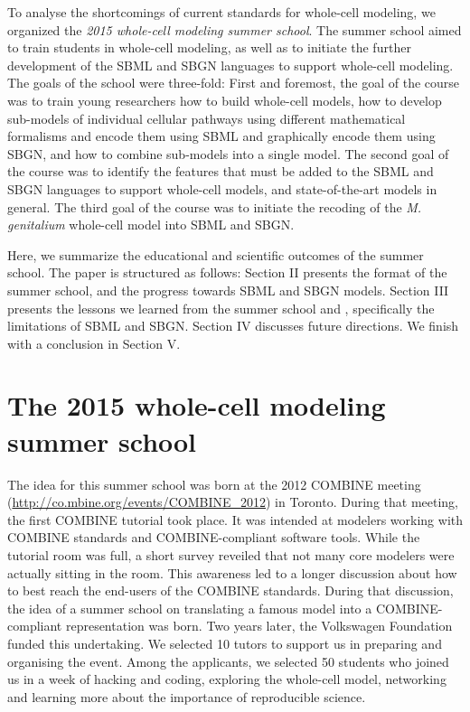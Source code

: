 \documentclass[journal,transmag]{IEEEtran}
\begin{document}
To analyse the shortcomings of current standards for whole-cell modeling, we organized the \emph{2015 whole-cell modeling summer school}. 
The summer school aimed to train students in whole-cell modeling, as well as to initiate the further development of the SBML and SBGN languages to support whole-cell modeling.  
The goals of the school were three-fold: 
First and foremost, the goal of the course was to train young researchers how to build whole-cell models, how to develop sub-models of individual cellular pathways using different mathematical formalisms and encode them using SBML and graphically encode them using SBGN, and how to combine sub-models into a single model. 
The second goal of the course was to identify the features that must be added to the SBML and SBGN languages to support whole-cell models, and state-of-the-art models in general. 
The third goal of the course was to initiate the recoding of the \textit{M. genitalium} whole-cell model into SBML and SBGN.

Here, we summarize the educational and scientific outcomes of the summer school. The paper is structured as follows: 
Section II presents the format of the summer school, and the progress towards SBML and SBGN models.  
Section III presents the lessons we learned from the summer school and , specifically  the limitations of SBML and SBGN. 
Section IV discusses future directions. 
We finish with a conclusion in Section V. 

\section{The 2015 whole-cell modeling summer school}

The idea for this summer school was born at the 2012 COMBINE meeting (\url{http://co.mbine.org/events/COMBINE_2012}) in Toronto. During that meeting, the first COMBINE tutorial took place. It was intended at modelers working with COMBINE standards and COMBINE-compliant software tools. 
While the tutorial room was full, a short survey reveiled that not many core modelers were actually sitting in the room.  
This awareness led to a longer discussion about how to best reach the end-users of the COMBINE standards. 
During that discussion, the idea of a summer school on translating a famous model into a COMBINE-compliant representation was born. 
Two years later, the Volkswagen Foundation funded this undertaking. 
We selected 10 tutors to support us in preparing and organising the event. 
Among the applicants, we selected 50 students  who joined us in a week of hacking and coding, exploring the whole-cell model, networking and learning more about the importance of reproducible science.
\end{document}
